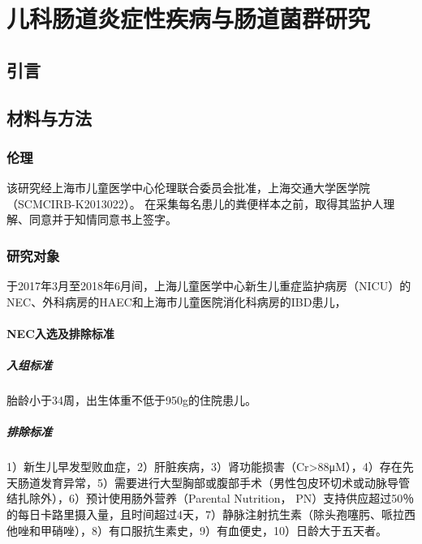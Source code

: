 
\chapter{儿科肠道炎症性疾病与肠道菌群研究}
\label{chap:compare}

\section{引言}
\section{材料与方法}
  \subsection{伦理}
  该研究经上海市儿童医学中心伦理联合委员会批准，上海交通大学医学院（SCMCIRB-K2013022）。 在采集每名患儿的粪便样本之前，取得其监护人理解、同意并于知情同意书上签字。
  \subsection{研究对象}
  于2017年3月至2018年6月间，上海儿童医学中心新生儿重症监护病房（NICU）的NEC、外科病房的HAEC和上海市儿童医院消化科病房的IBD患儿，
    \subsubsection{NEC入选及排除标准}
      \paragraph{入组标准}
      胎龄小于34周，出生体重不低于950g的住院患儿。
      \paragraph{排除标准}
      1）新生儿早发型败血症，2）肝脏疾病，3）肾功能损害（Cr>88μM），4）存在先天肠道发育异常，5）需要进行大型胸部或腹部手术（男性包皮环切术或动脉导管结扎除外），6）预计使用肠外营养（Parental Nutrition， PN）支持供应超过50％的每日卡路里摄入量，且时间超过4天，7）静脉注射抗生素（除头孢噻肟、哌拉西他唑和甲硝唑），8）有口服抗生素史，9）有血便史，10）日龄大于五天者。
